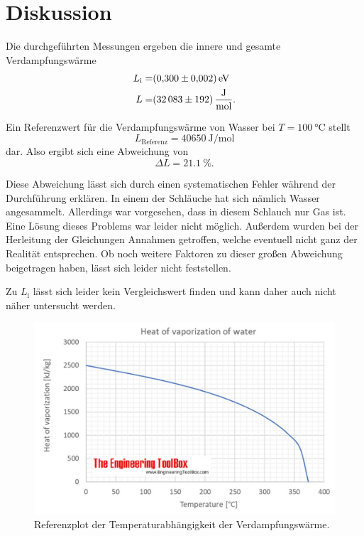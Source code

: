 \section{Diskussion}
\label{sec:Diskussion}


Die durchgeführten Messungen ergeben die innere und gesamte Verdampfungswärme
\begin{align*}
    L_\text{i} =& \SI{0.300+-0.002}{\electronvolt} \\
    L =& \SI{32083+-192}{\joule\per\mol}.
\end{align*}

Ein Referenzwert für die Verdampfungswärme von Wasser bei $T = \SI{100}{\celsius}$ stellt
\begin{equation*}
    L_\text{Referenz} = \SI{40650}{\joule\per\mol}
\end{equation*}
dar. \cite{Verdampfungswaerme}
Also ergibt sich eine Abweichung von
\begin{equation}
    \Delta L = \SI{21.1}{\percent}.
\end{equation}

Diese Abweichung lässt sich durch einen systematischen Fehler während der Durchführung erklären.
In einem der Schläuche hat sich nämlich Wasser angesammelt. 
Allerdings war vorgesehen, dass in diesem Schlauch nur Gas ist. Eine Lösung dieses Problems war leider nicht möglich.
Außerdem wurden bei der Herleitung der Gleichungen Annahmen getroffen, welche eventuell nicht ganz der Realität entsprechen.
Ob noch weitere Faktoren zu dieser großen Abweichung beigetragen haben, lässt sich leider nicht feststellen.

Zu $L_\text{i}$ lässt sich leider kein Vergleichswert finden und kann daher auch nicht näher untersucht werden.

\begin{figure}
    \centering
    \includegraphics[width=\textwidth]{images/referenz.png}
    \caption{Referenzplot der Temperaturabhängigkeit der Verdampfungswärme. \cite{Verdampfungswaerme}}
    \label{fig:referenz_plot}
\end{figure}

